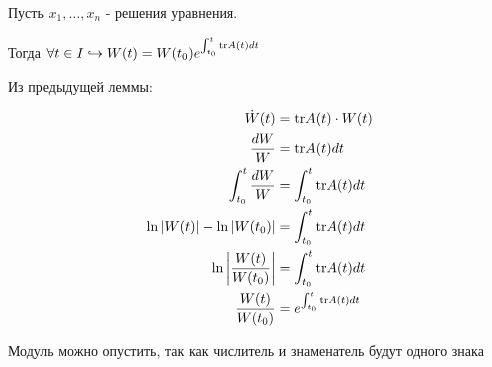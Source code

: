 \Endproof

Пусть $x_1, \dots, x_n$ - решения уравнения.

Тогда $\forall t \in I \hookrightarrow W(t) = W(t_0) e^{\int_{t_0}^t \text{tr} A(t) dt}$

\Proof

Из предыдущей леммы:

\begin{align*}
    \dot{W}(t) &= \text{tr} A(t) \cdot W(t) \\
    \frac{dW}{W} &= \text{tr} A(t) dt \\
    \int_{t_0}^t \frac{dW}{W} &= \int_{t_0}^t  \text{tr} A(t) dt \\
    \ln |W(t)| - \ln |W(t_0)| &= \int_{t_0}^t  \text{tr} A(t) dt \\
    \ln \left|\frac{W(t)}{W(t_0)}\right| &= \int_{t_0}^t  \text{tr} A(t) dt \\
    \frac{W(t)}{W(t_0)} &= e^{\int_{t_0}^t  \text{tr} A(t) dt}
\end{align*}

Модуль можно опустить, так как числитель и знаменатель будут одного знака

\Endproof

